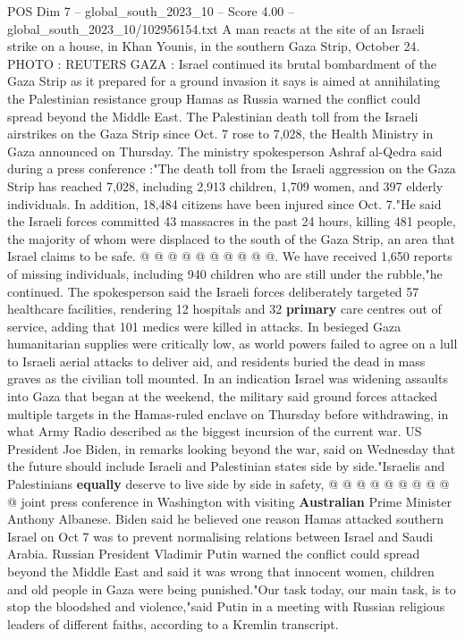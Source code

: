 \begin{textsample}{POS Dim 7 – global\_south\_2023\_10 – Score 4.00 – global\_south\_2023\_10/102956154.txt}  \label{ex:f7_pos_390}
A man reacts at the site of an Israeli strike on a house, in Khan Younis, in the southern Gaza Strip, October 24.
PHOTO : REUTERS GAZA : Israel continued its brutal bombardment of the Gaza Strip as it prepared for a ground invasion it says is aimed at annihilating the Palestinian resistance group Hamas as Russia warned the conflict could spread beyond the Middle East.
The Palestinian death toll from the Israeli airstrikes on the Gaza Strip since Oct. 7 rose to 7,028, the Health Ministry in Gaza announced on Thursday.
The ministry spokesperson Ashraf al-Qedra said during a press conference :"The death toll from the Israeli aggression on the Gaza Strip has reached 7,028, including 2,913 children, 1,709 women, and 397 elderly individuals.
In addition, 18,484 citizens have been injured since Oct. 7."He said the Israeli forces committed 43 massacres in the past 24 hours, killing 481 people, the majority of whom were displaced to the south of the Gaza Strip, an area that Israel claims to be safe. @ @ @ @ @ @ @ @ @ @.
We have received 1,650 reports of missing individuals, including 940 children who are still under the rubble,"he continued.
The spokesperson said the Israeli forces deliberately targeted 57 healthcare facilities, rendering 12 hospitals and 32 \textbf{primary} care centres out of service, adding that 101 medics were killed in attacks.
In besieged Gaza humanitarian supplies were critically low, as world powers failed to agree on a lull to Israeli aerial attacks to deliver aid, and residents buried the dead in mass graves as the civilian toll mounted.
In an indication Israel was widening assaults into Gaza that began at the weekend, the military said ground forces attacked multiple targets in the Hamas-ruled enclave on Thursday before withdrawing, in what Army Radio described as the biggest incursion of the current war.
US President Joe Biden, in remarks looking beyond the war, said on Wednesday that the future should include Israeli and Palestinian states side by side."Israelis and Palestinians \textbf{equally} deserve to live side by side in safety, @ @ @ @ @ @ @ @ @ @ joint press conference in Washington with visiting \textbf{Australian} Prime Minister Anthony Albanese.
Biden said he believed one reason Hamas attacked southern Israel on Oct 7 was to prevent normalising relations between Israel and Saudi Arabia.
Russian President Vladimir Putin warned the conflict could spread beyond the Middle East and said it was wrong that innocent women, children and old people in Gaza were being punished."Our task today, our main task, is to stop the bloodshed and violence,"said Putin in a meeting with Russian religious leaders of different faiths, according to a Kremlin transcript.

\end{textsample}

